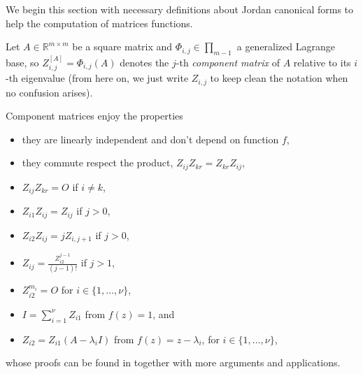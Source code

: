 
We begin this section with necessary definitions about Jordan canonical forms
to help the computation of matrices functions.

Let $A\in\mathbb{R}^{m\times m}$ be a square matrix and $\Phi_{i,j}
\in\prod_{m-1}$ a generalized Lagrange base, so $Z_{i,j}^{[A]} = \Phi_{i,j}(A)$
denotes the $j$-th \textit{component matrix} of $A$ relative to its $i$-th
eigenvalue (from here on, we just write $Z_{i,j}$ to keep clean the notation
when no confusion arises).

Component matrices enjoy the properties
\begin{itemize}
\item they are linearly independent and don't depend on function $f$,
\item they commute respect the product, $Z_{ij}Z_{kr}= Z_{kr}Z_{ij}$,
\item $Z_{ij}Z_{kr}=O$ if $i\neq k$,
\item $Z_{i1}Z_{ij}=Z_{ij}$ if $j > 0 $,
\item $Z_{i2}Z_{ij}=jZ_{i,j+1}$ if $j > 0 $,
\item $Z_{ij}=\frac{Z_{i2}^{j-1}}{(j-1)!}$ if $j > 1 $,
\item $Z_{i2}^{m_{i}}=O$ for $i\in\lbrace 1,\ldots,\nu\rbrace$,
\item $I = \sum_{i=1}^{\nu}{Z_{i1}}$ from $f(z)=1$, and
\item $Z_{i2} = Z_{i1}(A-\lambda_{i}I)$ from $f(z)=z-\lambda_{i}$, for
        $i\in\lbrace 1,\ldots,\nu\rbrace$,
\end{itemize}
whose proofs can be found in \citep{BT1998, LT2002} together with more
arguments and applications.

